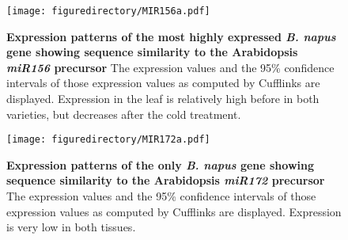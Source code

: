 \documentclass[12pt,]{book}
\begin{document}
\begin{figure}[htbp]
\centering
\texttt{[image: figuredirectory/MIR156a.pdf]}
\caption{\textbf{Expression patterns of the most highly expressed
\emph{B. napus} gene showing sequence similarity to the Arabidopsis
\emph{miR156} precursor} The expression values and the 95\% confidence
intervals of those expression values as computed by Cufflinks are
displayed. Expression in the leaf is relatively high before in both
varieties, but decreases after the cold
treatment.}\label{figure:winter:mir156}
\end{figure}

\begin{figure}[htbp]
\centering
\texttt{[image: figuredirectory/MIR172a.pdf]}
\caption{\textbf{Expression patterns of the only \emph{B. napus} gene
showing sequence similarity to the Arabidopsis \emph{miR172} precursor}
The expression values and the 95\% confidence intervals of those
expression values as computed by Cufflinks are displayed. Expression is
very low in both tissues.}\label{figure:winter:mir172}
\end{figure}
\end{document}
